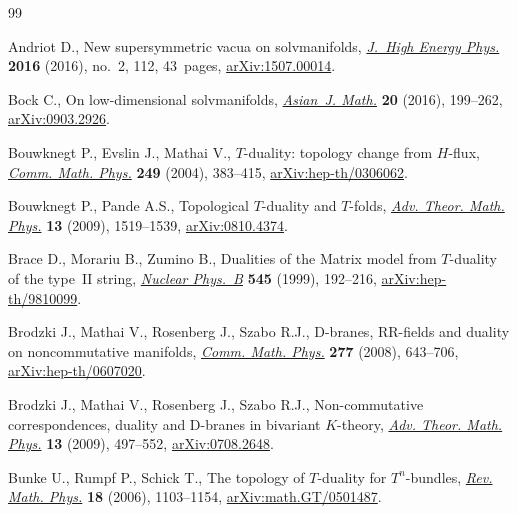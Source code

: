 \documentclass[pdftex]{sigma}
\numberwithin{equation}{section}
\begin{document}
\begin{thebibliography}{99}
\footnotesize\itemsep=0pt

Andriot D., New supersymmetric vacua on solvmanifolds, \href{https://doi.org/10.1007/JHEP02(2016)112}{\textit{J.~High Energy
 Phys.}} \textbf{2016} (2016), no.~2, 112, 43~pages, \href{https://arxiv.org/abs/1507.00014}{arXiv:1507.00014}.

Bock C., On low-dimensional solvmanifolds, \href{https://doi.org/10.4310/AJM.2016.v20.n2.a1}{\textit{Asian~J. Math.}} \textbf{20}
 (2016), 199--262, \href{https://arxiv.org/abs/0903.2926}{arXiv:0903.2926}.

Bouwknegt P., Evslin J., Mathai V., {$T$}-duality: topology change from
 {$H$}-flux, \href{https://doi.org/10.1007/s00220-004-1115-6}{\textit{Comm. Math. Phys.}} \textbf{249} (2004), 383--415,
 \href{https://arxiv.org/abs/hep-th/0306062}{arXiv:hep-th/0306062}.

Bouwknegt P., Pande A.S., Topological {$T$}-duality and {$T$}-folds,
 \href{https://doi.org/10.4310/ATMP.2009.v13.n5.a6}{\textit{Adv. Theor. Math. Phys.}} \textbf{13} (2009), 1519--1539,
 \href{https://arxiv.org/abs/0810.4374}{arXiv:0810.4374}.

Brace D., Morariu B., Zumino B., Dualities of the {M}atrix model from
 {$T$}-duality of the type~{II} string, \href{https://doi.org/10.1016/S0550-3213(99)00009-7}{\textit{Nuclear Phys.~B}} \textbf{545}
 (1999), 192--216, \href{https://arxiv.org/abs/hep-th/9810099}{arXiv:hep-th/9810099}.

Brodzki J., Mathai V., Rosenberg J., Szabo R.J., D-branes, {RR}-fields and
 duality on noncommutative manifolds, \href{https://doi.org/10.1007/s00220-007-0396-y}{\textit{Comm. Math. Phys.}} \textbf{277}
 (2008), 643--706, \href{https://arxiv.org/abs/hep-th/0607020}{arXiv:hep-th/0607020}.

Brodzki J., Mathai V., Rosenberg J., Szabo R.J., Non-commutative
 correspondences, duality and {D}-branes in bivariant {$K$}-theory,
 \href{https://doi.org/10.4310/ATMP.2009.v13.n2.a4}{\textit{Adv. Theor. Math. Phys.}} \textbf{13} (2009), 497--552,
 \href{https://arxiv.org/abs/0708.2648}{arXiv:0708.2648}.

Bunke U., Rumpf P., Schick T., The topology of {$T$}-duality for
 {$T^n$}-bundles, \href{https://doi.org/10.1142/S0129055X06002875}{\textit{Rev. Math. Phys.}} \textbf{18} (2006), 1103--1154,
 \href{https://arxiv.org/abs/math.GT/0501487}{arXiv:math.GT/0501487}.


\end{thebibliography}
\end{document}
